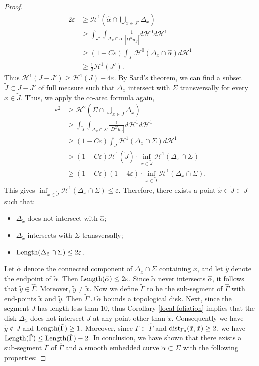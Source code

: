 \documentclass[a4paper, reqno]{amsart}
\theoremstyle{definition}
\theoremstyle{remark}
\numberwithin{equation}{section}
\newcommand{\dist}{\textup{dist}}
\newcommand{\Len}{\textup{Length}}
\numberwithin{equation}{section}
\numberwithin{equation}{section}
\begin{document}
\begin{proof}
		\begin{align*}
			2\varepsilon &\geq \mathcal{H}^1( \hat{\alpha}\cap\bigcup_{x\in J'}\Delta_x)\\
			&\geq\int_{J'}\int_{\Delta_x\cap\hat{\alpha}}\frac{1}{|D^{\hat{\alpha}}u_J|}d\mathcal{H}^0 d\mathcal{H}^1\\
			&\geq (1-C\varepsilon)\int_{J'}\mathcal{H}^0(\Delta_x\cap\hat{\alpha})d\mathcal{H}^1\\
			&\geq \frac{1}{2}\mathcal{H}^1(J').	
		\end{align*}
		Thus $\mathcal{H}^1(J - J')\geq \mathcal{H}^1(J)-4\varepsilon$.	 By Sard's theorem, we can find a subset $\tilde{J}\subset J - J'$ of full measure such that $\Delta_x$ intersect with $\Sigma$ transversally for every $x\in\tilde{J}$. Thus, we apply the co-area formula again, 		
		\begin{align*}
			\varepsilon^2 &\geq \mathcal{H}^2(\Sigma \cap\bigcup_{x\in \tilde{J}}\Delta_x)	\\
			&\geq \int_{\tilde{J}}\int_{\Delta_x\cap \Sigma}\frac{1}{|D^{\Sigma}u_J|}d\mathcal{H}^1 d\mathcal{H}^1\\
			&\geq (1-C\varepsilon)\int_{\tilde{J}}\mathcal{H}^1(\Delta_x\cap \Sigma)d\mathcal{H}^1\\
			&> (1-C\varepsilon) \mathcal{H}^1(\tilde{J})\cdot\inf_{x\in\tilde{J}}\mathcal{H}^1(\Delta_x\cap \Sigma)\\
			&\geq (1-C\varepsilon)(1-4\varepsilon)\cdot\inf_{x\in\tilde{J}}\mathcal{H}^1(\Delta_x\cap \Sigma).
		\end{align*}
		This gives $\inf_{x\in\tilde{J}}\mathcal{H}^1(\Delta_x\cap \Sigma)\leq \varepsilon$. Therefore, there exists a point $\tilde{x}\in\tilde{J}\subset J$ such that:
		\begin{itemize}
		\item $\Delta_{\tilde{x}}$ does not intersect with $\hat{\alpha}$;
		\item $\Delta_{\tilde{x}}$ intersects with $\Sigma$ transversally;
		\item $\Len(\Delta_{\tilde{x}}\cap\Sigma)\leq 2\varepsilon$.
		\end{itemize}
		Let $\tilde{\alpha}$ denote the connected component of $\Delta_{\tilde{x}}\cap\Sigma$ containing $\tilde{x}$, and let $\tilde{y}$ denote the endpoint of $\tilde{\alpha}$. Then $\Len(\tilde{\alpha})\leq 2\varepsilon$. Since $\tilde{\alpha}$ never intersects $\hat{\alpha}$, it follows that $\tilde{y}\in\hat{\Gamma}$. Moreover, $\tilde{y}\neq\tilde{x}$.
		Now we define $\tilde{\Gamma}$ to be the sub-segment of $\hat{\Gamma}$ with end-points $\tilde{x}$ and $\tilde{y}$. Then $\tilde{\Gamma}\cup\tilde{\alpha}$ bounds a topological disk. Next, since the segment $J$ has length less than 10, thus Corollary \ref{local foliation} implies that the disk $\Delta_{\tilde{x}}$ does not intersect $J$ at any point other than $\tilde{x}$. Consequently we have $\tilde{y}\notin J$ and $\Len(\tilde{\Gamma})\geq 1$. Moreover, since $\tilde{\Gamma}\subset\hat{\Gamma}$ and $\dist_{\Gamma_0}(\tilde{x}, \hat{x})\geq 2$, we have $\Len(\tilde{\Gamma})\leq \Len(\hat{\Gamma}) - 2$. In conclusion, we have shown that there exists a sub-segment $\tilde{\Gamma}$ of $\hat{\Gamma}$ and a smooth embedded curve $\tilde{\alpha}\subset\Sigma$ with the following properties: 

\end{proof}
\end{document}
